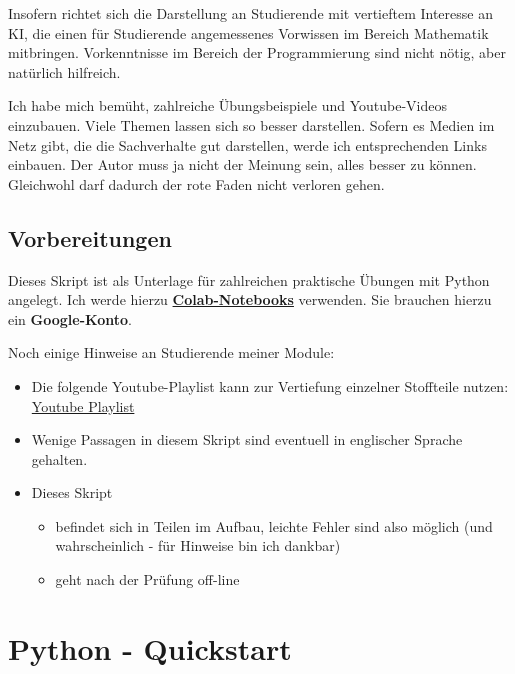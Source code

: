 \documentclass[
  oneside]{book}
\providecommand{\tightlist}{%
  \setlength{\itemsep}{0pt}\setlength{\parskip}{0pt}}
\begin{document}
Insofern richtet sich die Darstellung an Studierende mit vertieftem Interesse an KI, die einen für Studierende angemessenes Vorwissen im Bereich Mathematik mitbringen. Vorkenntnisse im Bereich der Programmierung sind nicht nötig, aber natürlich hilfreich.

Ich habe mich bemüht, zahlreiche Übungsbeispiele und Youtube-Videos einzubauen. Viele Themen lassen sich so besser darstellen. Sofern es Medien im Netz gibt, die die Sachverhalte gut darstellen, werde ich entsprechenden Links einbauen. Der Autor muss ja nicht der Meinung sein, alles besser zu können. Gleichwohl darf dadurch der rote Faden nicht verloren gehen.

\hypertarget{vorbereitungen}{%
\section{Vorbereitungen}\label{vorbereitungen}}

Dieses Skript ist als Unterlage für zahlreichen praktische Übungen mit Python angelegt. Ich werde hierzu \href{https://colab.research.google.com/}{\textbf{Colab-Notebooks}} verwenden. Sie brauchen hierzu ein \textbf{Google-Konto}.

Noch einige Hinweise an Studierende meiner Module:

\begin{itemize}
\tightlist
\item
  Die folgende Youtube-Playlist kann zur Vertiefung einzelner Stoffteile nutzen: \href{https://youtube.com/playlist?list=PLfGN40VwjduJPvtP9QUjC0rjM6-ePT9bg}{Youtube Playlist}
\item
  Wenige Passagen in diesem Skript sind eventuell in englischer Sprache gehalten.
\item
  Dieses Skript

  \begin{itemize}
  \tightlist
  \item
    befindet sich in Teilen im Aufbau, leichte Fehler sind also möglich (und wahrscheinlich - für Hinweise bin ich dankbar)
  \item
    geht nach der Prüfung off-line
  \end{itemize}
\end{itemize}

\hypertarget{python---quickstart}{%
\chapter{Python - Quickstart}\label{python---quickstart}}
\end{document}
